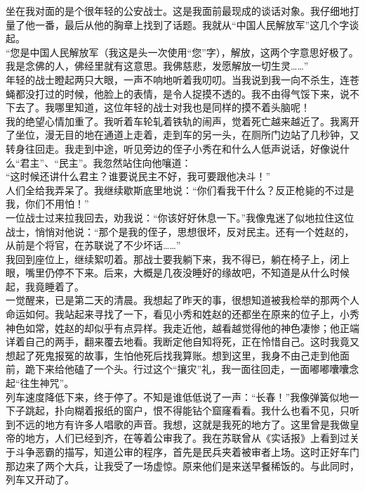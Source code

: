 坐在我对面的是个很年轻的公安战士。这是我面前最现成的谈话对象。我仔细地打量了他一番，最后从他的胸章上找到了话题。我就从“中国人民解放军”这几个字谈起。\\

“您是中国人民解放军（我这是头一次使用“您”字），解放，这两个字意思好极了。我是念佛的人，佛经里就有这意思。我佛慈悲，发愿解放一切生灵……”\\

年轻的战士瞪起两只大眼，一声不响地听着我叨叨。当我说到我一向不杀生，连苍蝇都没打过的时候，他脸上的表情，是令人捉摸不透的。我不由得气馁下来，说不下去了。我哪里知道，这位年轻的战士对我也是同样的摸不着头脑呢！\\

我的绝望心情加重了。我听着车轮轧着铁轨的闹声，觉着死亡越来越近了。我离开了坐位，漫无目的地在通道上走着，走到车的另一头，在厕所门边站了几秒钟，又转身往回走。我走到中途，听见旁边的侄子小秀在和什么人低声说话，好像说什么“君主”、“民主”。我忽然站住向他嚷道：\\

“这时候还讲什么君主？谁要说民主不好，我可要跟他决斗！”\\

人们全给我弄呆了。我继续歇斯底里地说：“你们看我干什么？反正枪毙的不过是我，你们不用怕！”\\

一位战士过来拉我回去，劝我说：“你该好好休息一下。”我像鬼迷了似地拉住这位战士，悄悄对他说：“那个是我的侄子，思想很坏，反对民主。还有一个姓赵的，从前是个将官，在苏联说了不少坏话……”\\

我回到座位上，继续絮叨着。那战士要我躺下来，我不得已，躺在椅子上，闭上眼，嘴里仍停不下来。后来，大概是几夜没睡好的缘故吧，不知道是从什么时候起，我竟睡着了。\\

一觉醒来，已是第二天的清晨。我想起了昨天的事，很想知道被我检举的那两个人命运如何。我站起来寻找了一下，看见小秀和姓赵的还都坐在原来的位子上，小秀神色如常，姓赵的却似乎有点异样。我走近他，越看越觉得他的神色凄惨；他正端详着自己的两手，翻来覆去地看。我断定他自知将死，正在怜惜自己。这时我竟又想起了死鬼报冤的故事，生怕他死后找我算账。想到这里，我身不由己走到他面前，跪下来给他磕了一个头。行过这个“攘灾”礼，我一面往回走，一面嘟嘟囔囔念起“往生神咒”。\\

列车速度降低下来，终于停了。不知是谁低低说了一声：“长春！”我像弹簧似地一下子跳起，扑向糊着报纸的窗户，恨不得能钻个窟窿看看。我什么也看不见，只听到不远的地方有许多人唱歌的声音。我想，这就是我死的地方了。这里曾是我做皇帝的地方，人们已经到齐，在等着公审我了。我在苏联曾从《实话报》上看到过关于斗争恶霸的描写，知道公审的程序，首先是民兵夹着被审者上场。这时正好车门那边来了两个大兵，让我受了一场虚惊。原来他们是来送早餐稀饭的。与此同时，列车又开动了。\\

